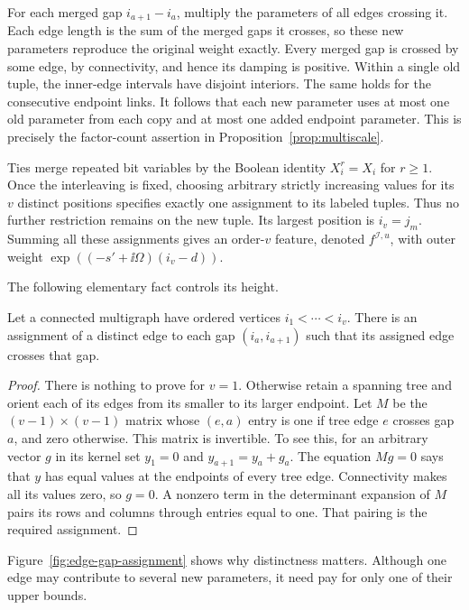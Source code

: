 For each merged gap $i_{a+1}-i_a$, multiply the parameters of all edges
crossing it. Each edge length is the sum of the merged gaps it crosses,
so these new parameters reproduce the original weight exactly.
Every merged gap is crossed by some edge, by connectivity, and hence
its damping is positive. Within a single old tuple, the inner-edge
intervals have disjoint interiors. The same holds for the consecutive
endpoint links. It follows that each new parameter uses at most one
old parameter from each copy and at most one added endpoint parameter.
This is precisely the factor-count assertion in
Proposition~\ref{prop:multiscale}.

Ties merge repeated bit variables by the Boolean identity $X_i^r=X_i$
for $r\ge1$. Once the interleaving is fixed, choosing arbitrary strictly
increasing values for its $v$ distinct positions specifies exactly one
assignment to its labeled tuples. Thus no further restriction remains
on the new tuple. Its largest position is $i_v=j_m$. Summing all these
assignments gives an order-$v$ feature, denoted $f^{\mathcal I,u}$,
with outer weight $\exp((-s'+\ii\Omega)(i_v-d))$.

The following elementary fact controls its height.

\begin{lemma}
\label{lem:edge-gap-assignment}
Let a connected multigraph have ordered vertices $i_1<\cdots<i_v$.
There is an assignment of a distinct edge to each gap
$(i_a,i_{a+1})$ such that its assigned edge crosses that gap.
\end{lemma}

\begin{proof}
There is nothing to prove for $v=1$. Otherwise retain a spanning tree
and orient each of its edges from its smaller to its larger endpoint.
Let $M$ be the $(v-1)\times(v-1)$ matrix whose $(e,a)$ entry is one if
tree edge $e$ crosses gap $a$, and zero otherwise. This matrix is
invertible. To see this, for an arbitrary vector $g$ in its kernel set
$y_1=0$ and $y_{a+1}=y_a+g_a$. The equation $Mg=0$ says that $y$ has
equal values at the endpoints of every tree edge. Connectivity makes
all its values zero, so $g=0$. A nonzero term in the determinant
expansion of $M$ pairs its rows and columns through entries equal to
one. That pairing is the required assignment.
\end{proof}

Figure~\ref{fig:edge-gap-assignment} shows why distinctness matters.
Although one edge may contribute to several new parameters, it need
pay for only one of their upper bounds.

